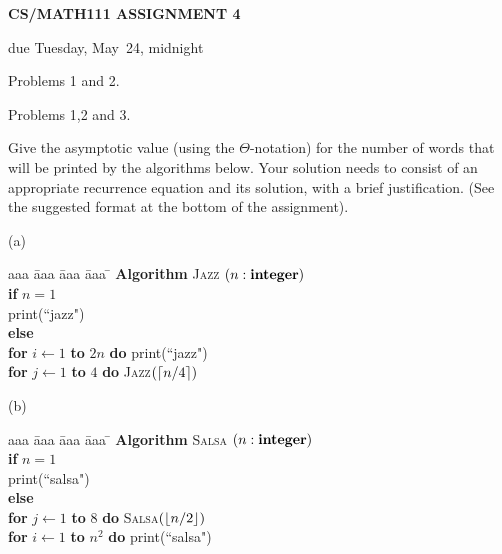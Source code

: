 \documentclass{article}
\begin{document}
\centerline{\large \bf CS/MATH111 ASSIGNMENT 4}
\centerline{due Tuesday, May~24, midnight}

\vskip 0.2in
 Problems 1 and 2.

 Problems 1,2 and 3.

\vskip 0.1in


\begin{problem}
Give the asymptotic value (using the $\Theta$-notation)
for the number of words that will be printed by the algorithms below.
Your solution needs to consist of an appropriate recurrence 
equation and its solution, with a brief justification.
(See the suggested format at the bottom of the assignment).

\bigskip
\noindent
(a)\ \ 
\begin{minipage}[t]{3in}
\begin{tabbing}
aaa \= aaa \= aaa \= aaa \=  \kill
\textbf{Algorithm} \textsc{Jazz} $(n: \mbox{\bf integer})$ \\
          \> \textbf{if} $n = 1$ \\
          \>\>  print(``jazz") \\
          \>\textbf{else} \\
      		\>\> \textbf{for} $i \leftarrow 1$ \textbf{to} $2n$ \textbf{do} print(``jazz")\\
          \>\>  \textbf{for} $j\leftarrow 1$ \textbf{to} $4$ 
				\textbf{do} \textsc{Jazz}$({\left\lceil n/4\right\rceil})$
\end{tabbing}
\end{minipage}

\bigskip
\noindent
(b)\ \
\begin{minipage}[t]{3in}
\begin{tabbing}
aaa \= aaa \= aaa \= aaa \=  \kill
\textbf{Algorithm} \textsc{Salsa} $(n: \mbox{\bf integer})$ \\
          \> \textbf{if} $n = 1$ \\
          \>\>  print(``salsa") \\
          \>\textbf{else} \\
          \>\>  \textbf{for} $j \leftarrow 1$ \textbf{to} $8$ 
					\textbf{do} \textsc{Salsa}$({\left\lfloor n/2\right\rfloor})$\\
      \>\> \textbf{for} $i \leftarrow 1$ \textbf{to} $n^2$ \textbf{do} print(``salsa")
\end{tabbing}
\end{minipage}


\end{problem}
\end{document}
